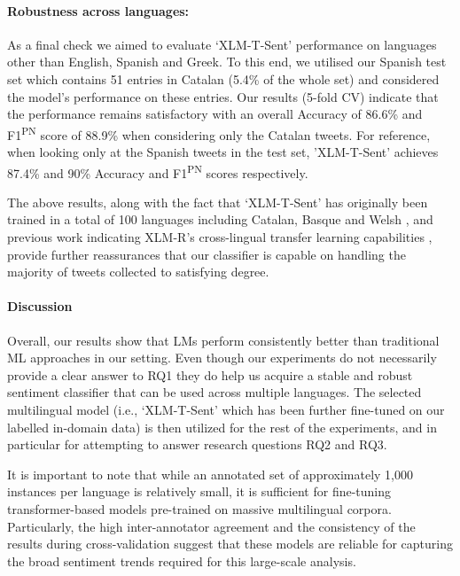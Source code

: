 \paragraph{Robustness across languages:} As a final check we aimed to evaluate `XLM-T-Sent' performance on languages other than English, Spanish and Greek. To this end, we utilised our Spanish test set which contains 51 entries in Catalan (5.4\% of the whole set) and considered the model’s performance on these entries. Our results (5-fold CV) indicate that the performance remains satisfactory with an overall Accuracy of 86.6\% and F1\textsuperscript{PN} score of 88.9\% when considering only the Catalan tweets. For reference, when looking only at the Spanish tweets in the test set, 'XLM-T-Sent' achieves 87.4\% and 90\% Accuracy and F1\textsuperscript{PN} scores respectively.

The above results, along with the fact that `XLM-T-Sent' has originally been trained in a total of 100 languages including Catalan, Basque and Welsh \cite{conneau2019unsupervised}, and previous work indicating XLM-R’s cross-lingual transfer learning capabilities \cite{barbieri2021xlm, li2021improving, rusliapplicability}, provide further reassurances that our classifier is capable on handling the majority of tweets collected to satisfying degree.


\paragraph{Discussion} Overall, our results show that \acp{LM} perform consistently better than traditional \ac{ML} approaches in our setting. Even though our experiments do not necessarily provide a clear answer to RQ1 they do help us acquire a stable and robust sentiment classifier that can be used across multiple languages. The selected multilingual model (i.e., `XLM-T-Sent' which has been further fine-tuned on our labelled in-domain data) is then utilized for the rest of the experiments, and in particular for attempting to answer research questions RQ2 and RQ3.

It is important to note that while an annotated set of approximately 1,000 instances per language is relatively small, it is sufficient for fine-tuning transformer-based models pre-trained on massive multilingual corpora. Particularly, the high inter-annotator agreement and the consistency of the results during cross-validation suggest that these models are reliable for capturing the broad sentiment trends required for this large-scale analysis.

